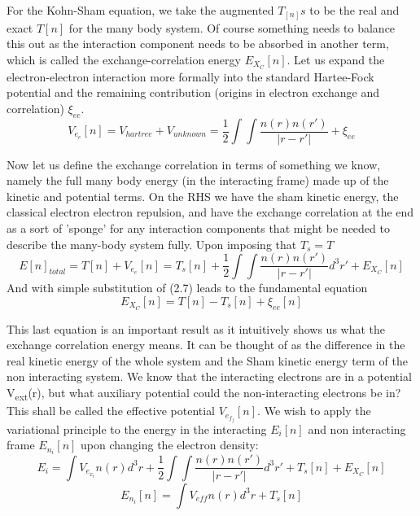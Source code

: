 \documentclass[12pt]{article}
\begin{document}
For the Kohn-Sham equation, we take the augmented $T_[n]s$ to be the real and exact $T[n]$ for the many body system. Of course something needs to balance this out as the interaction component needs to be absorbed in another term, which is called the exchange-correlation energy $E_X_C[n]$. Let us expand the electron-electron interaction more formally into the standard Hartee-Fock potential and the remaining contribution (origins in electron exchange and correlation) $\xi_{ee}$.
\begin{equation} \label{2.6} \tag{2.6}
V_e_e[n] =V_{hartree}+V_{unknown}=\frac{1}{2}\int \int \frac{n(r)n(r')}{|r-r'|} + \xi_{ee}
\end{equation}


Now let us define the exchange correlation in terms of something we know, namely the full many body energy (in the interacting frame) made up of the kinetic and potential terms. On the RHS we have the sham kinetic energy, the classical electron electron repulsion, and have the exchange correlation at the end as a sort of 'sponge' for any interaction components that might be needed to describe the many-body system fully. Upon imposing that $T_s=T$
\begin{equation} \label{2.6} \tag{2.7}
E[n]_{total}=T[n]+V_e_e[n] = T_s[n] + \frac{1}{2}\int \int \frac{n(r)n(r')}{|r-r'|}d^3 r' + E_X_C[n]
\end{equation}
And with simple substitution of (2.7) leads to the fundamental equation
\begin{equation} \label{2.7} \tag{2.8}
E_X_C[n]=T[n] -T_s[n] + \xi_{ee}[n]
\end{equation}

This last equation is an important result as it intuitively shows us what the exchange correlation energy means. It can be thought of as the difference in the real kinetic energy of the whole system and the Sham kinetic energy term of the non interacting system. We know that the interacting electrons are in a potential V\textsubscript{ext}(r), but what auxiliary potential could the non-interacting electrons be in? This shall be called the effective potential $V_e_f_f[n]$. We wish to apply the variational principle to the energy in the interacting $E_i[n]$ and non interacting frame $E_n_i[n]$ upon changing the electron density:
\begin{equation} \label{2.8} \tag{2.9}
E_i=\int V_e_x_tn(r)d^3r + \frac{1}{2}\int \int \frac{n(r)n(r')}{|r-r'|}d^3 r' + T_s[n]+E_X_C[n]
\end{equation}
\begin{equation} \label{2.9} \tag{2.10}
E_n_i[n]= \int V_{eff} n(r)d^3r + T_s[n]
\end{equation}
\end{document}
